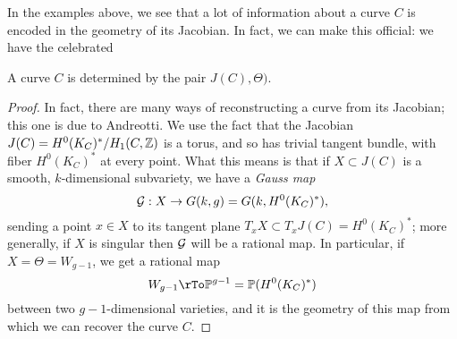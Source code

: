 In the examples above, we see that a lot of information about a curve $C$ is encoded in the geometry of its Jacobian. In fact, we can make this official: we have the celebrated

\begin{theorem}[Torelli]
A curve $C$ is determined by the pair $J(C), \Theta)$.
\end{theorem}

\begin{proof}
In fact, there are many ways of reconstructing a curve from its Jacobian; this one is  due to Andreotti. We use the fact that the Jacobian $J(C) = H^0(K_C)^*/H_1(C,\ZZ)$ is a torus, and so has trivial tangent bundle, with fiber $H^0(K_C)^*$ at every point. What this means is that if $X \subset J(C)$ is a smooth, $k$-dimensional subvariety, we have a \emph{Gauss map}
$$
\cG : X \to G(k, g) = G(k, H^0(K_C)^*),
$$
sending a point $x \in X$ to its tangent plane $T_xX \subset T_xJ(C) = H^0(K_C)^*$; more generally, if $X$ is singular then $\cG$ will be a rational map. In particular, if $X = \Theta = W_{g-1}$, we get a rational map
$$
W_{g-1} \rTo \PP^{g-1} = \PP(H^0(K_C)^*)
$$
between two $g-1$-dimensional varieties, and it is the geometry of this map from which we can recover the curve $C$.

\end{proof}



